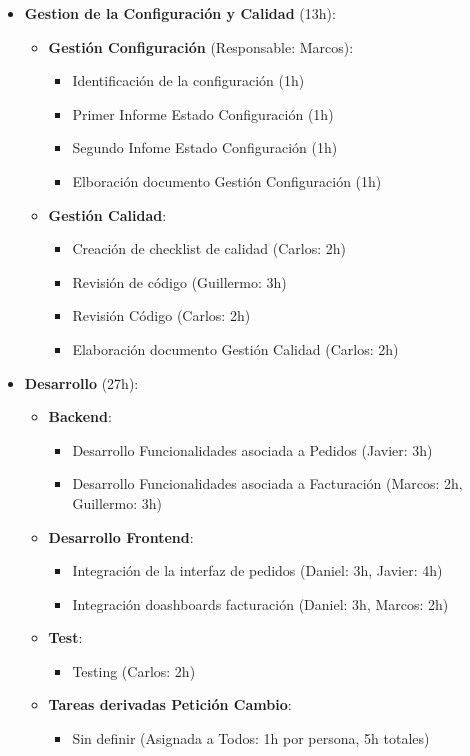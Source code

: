 \documentclass[12pt,a4paper,titlepage]{article}
\begin{document}
\begin{itemize}
    \item \textbf{Gestion de la Configuración y Calidad} (13h):
    \begin{itemize}
        \item \textbf{Gestión Configuración} (Responsable: Marcos):
        \begin{itemize}
            \item Identificación de la configuración (1h)
            \item Primer Informe Estado Configuración (1h)
            \item Segundo Infome Estado Configuración (1h)
            \item Elboración documento Gestión Configuración (1h)
        \end{itemize}
        \item \textbf{Gestión Calidad}:
        \begin{itemize}
            \item Creación de checklist de calidad (Carlos: 2h)
            \item Revisión de código (Guillermo: 3h)
            \item Revisión Código (Carlos: 2h)
            \item Elaboración documento Gestión Calidad (Carlos: 2h)
        \end{itemize}
    \end{itemize}

    \item \textbf{Desarrollo} (27h):
    \begin{itemize}
        \item \textbf{Backend}:
        \begin{itemize}
            \item Desarrollo Funcionalidades asociada a Pedidos (Javier: 3h)
            \item Desarrollo Funcionalidades asociada a Facturación (Marcos: 2h, Guillermo: 3h)
        \end{itemize}
        \item \textbf{Desarrollo Frontend}:
        \begin{itemize}
            \item Integración de la interfaz de pedidos (Daniel: 3h, Javier: 4h)
            \item Integración doashboards facturación (Daniel: 3h, Marcos: 2h)
        \end{itemize}
        \item \textbf{Test}:
        \begin{itemize}
            \item Testing (Carlos: 2h)
        \end{itemize}
        \item \textbf{Tareas derivadas Petición Cambio}:
        \begin{itemize}
            \item Sin definir (Asignada a Todos: 1h por persona, 5h totales)
        \end{itemize}
    \end{itemize}
\end{itemize}
\end{document}
